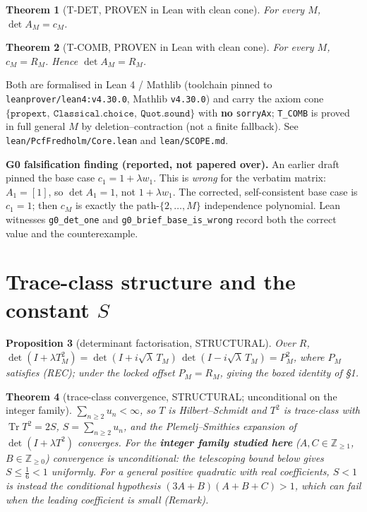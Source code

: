 \documentclass[
]{article}
\theoremstyle{plain}
\newtheorem{theorem}{Theorem}
\newtheorem{proposition}[theorem]{Proposition}
\theoremstyle{remark}
\begin{document}
\begin{theorem}[T-DET, PROVEN in Lean with clean cone]

For every \(M\), \(\det A_M = c_M\).

\end{theorem}

\begin{theorem}[T-COMB, PROVEN in Lean with clean cone]

For every \(M\), \(c_M = R_M\). Hence \(\det A_M = R_M\).

\end{theorem}

Both are formalised in Lean 4 / Mathlib (toolchain pinned to
\texttt{leanprover/lean4:v4.30.0}, Mathlib \texttt{v4.30.0}) and carry
the axiom cone
\(\{\texttt{propext},\ \texttt{Classical.choice},\ \texttt{Quot.sound}\}\)
with \textbf{no} \texttt{sorryAx}; \texttt{T\_COMB} is proved in full
general \(M\) by deletion--contraction (not a finite fallback). See
\texttt{lean/PcfFredholm/Core.lean} and \texttt{lean/SCOPE.md}.

\textbf{G0 falsification finding (reported, not papered over).} An
earlier draft pinned the base case \(c_1=1+\lambda w_1\). This is
\emph{wrong} for the verbatim matrix: \(A_1=[1]\), so \(\det A_1=1\),
not \(1+\lambda w_1\). The corrected, self-consistent base case is
\(c_1=1\); then \(c_M\) is exactly the path-\(\{2,\dots,M\}\)
independence polynomial. Lean witnesses \texttt{g0\_det\_one} and
\texttt{g0\_brief\_base\_is\_wrong} record both the correct value and
the counterexample.

\section{\texorpdfstring{Trace-class structure and the constant
\(S\)}{Trace-class structure and the constant S}}\label{trace-class-structure-and-the-constant-s}

\begin{proposition}[determinant factorisation, STRUCTURAL]

Over \(R\),
\(\det(I+\lambda T_M^2)=\det(I+i\sqrt\lambda\,T_M)\,\det(I-i\sqrt\lambda\,T_M)=P_M^2\),
where \(P_M\) satisfies (REC); under the locked offset \(P_M=R_M\),
giving the boxed identity of §1.

\end{proposition}

\begin{theorem}[trace-class convergence, STRUCTURAL; unconditional on the integer family]

\(\sum_{n\ge2}u_n<\infty\), so \(T\) is Hilbert--Schmidt and \(T^2\) is
trace-class with \(\operatorname{Tr}T^2=2S\), \(S=\sum_{n\ge2}u_n\), and
the Plemelj--Smithies expansion of \(\det(I+\lambda T^2)\) converges.
For the \textbf{integer family studied here}
(\(A,C\in\mathbb Z_{\ge1}\), \(B\in\mathbb Z_{\ge0}\)) convergence is
\emph{unconditional}: the telescoping bound below gives
\(S\le\tfrac16<1\) uniformly. For a general positive quadratic with real
coefficients, \(S<1\) is instead the \emph{conditional} hypothesis
\((3A+B)(A+B+C)>1\), which can fail when the leading coefficient is
small (Remark).

\end{theorem}
\end{document}
